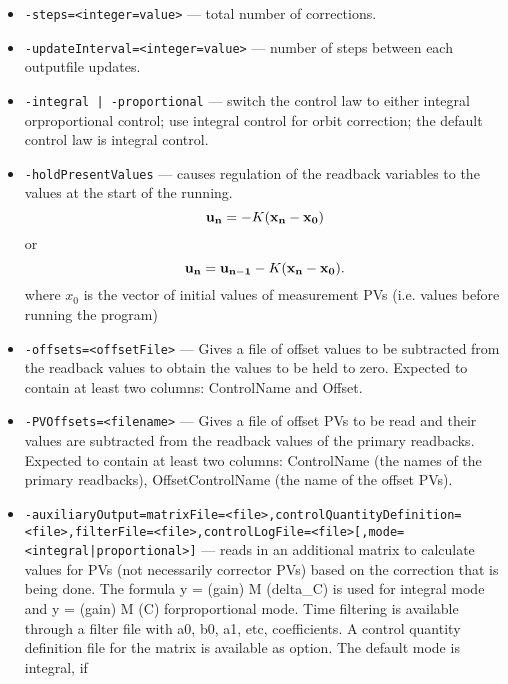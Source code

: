 \begin{itemize}
\begin{itemize}
        \item {\tt -steps=<integer=value>} ---  total number of corrections.
        \item {\tt -updateInterval=<integer=value>} --- number of steps between each outputfile updates.
        \item {\tt -integral | -proportional} --- 
               switch the control law to either integral orproportional
               control;  use integral control for orbit correction; 
               the default control law is integral control.
        \item {\tt -holdPresentValues} ---
               causes regulation of the readback variables to the
               values at the start of the running.
\begin{equation}
{\bf u_n} = - K ({\bf x_n} - {\bf x_0})
\end{equation}
or
\begin{equation}
{\bf u_n} = {\bf u_{n-1}} - K ({\bf x_n} - {\bf x_0}).
\end{equation}
where $x_0$ is the vector of initial values of measurement PVs (i.e. values before running the program)
        \item {\tt -offsets=<offsetFile>} --- Gives a file of offset values to be subtracted from the
               readback values to obtain the values to be held to zero.
               Expected to contain at least two columns: ControlName and Offset. 
        \item {\tt -PVOffsets=<filename>} --- Gives a file of offset PVs to be read and their values are 
               subtracted from the readback values of the primary readbacks.
               Expected to contain at least two columns: ControlName (the names 
               of the primary readbacks), OffsetControlName (the name of 
               the offset PVs). 
        \item {\tt -auxiliaryOutput=matrixFile=<file>,controlQuantityDefinition=<file>,filterFile=<file>,controlLogFile=<file>[,mode=<integral|proportional>]} ---
                reads in an additional matrix to calculate values for PVs  
               (not necessarily corrector PVs) based 
               on the correction that is being done. The formula 
               y = (gain) M (delta\_C) is used for integral mode and 
               y = (gain) M (C) forproportional mode. Time filtering 
               is available through a filter file with 
               a0, b0, a1, etc, coefficients. 
               A control quantity definition file for the matrix 
               is available as option. The default mode is integral, if 

\end{itemize}
\end{itemize}
